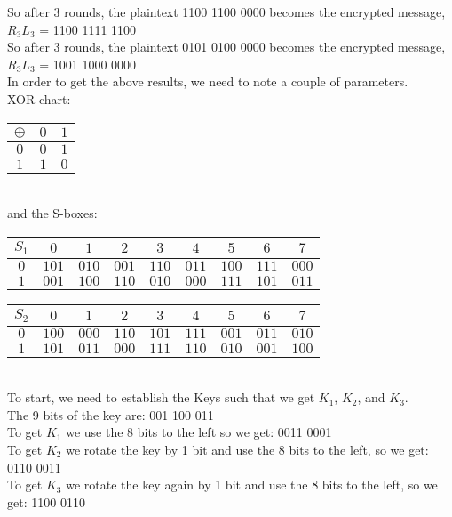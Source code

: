\documentclass[12pt,letterpaper,final]{report}
\begin{document}
\bigskip
So after 3 rounds, the plaintext 1100 1100 0000 becomes the encrypted message, $R_3L_3$ = 1100 1111 1100 \\
So after 3 rounds, the plaintext 0101 0100 0000 becomes the encrypted message, $R_3L_3$ = 1001 1000 0000 \\

\bigskip In order to get the above results, we need to note a couple of parameters.  \\
XOR chart:  
\indent\begin{tabular}{|c|c c|}
\hline
$ \oplus $ & $ 0 $ & $ 1 $ \\
\hline
$ 0 $ &  $ 0 $ & $ 1 $ \\
$ 1 $ & $ 1 $ & $ 0 $ \\
\hline
\end{tabular} \\

and the S-boxes: \\

\begin{tabular}{|c| c c c c c c c c|}
\hline
$ S_1 $ & $ 0 $ & $ 1 $ & $ 2 $ & $ 3 $ & $ 4 $ & $ 5 $ & $ 6 $ & $ 7 $ \\
\hline
$ 0 $ & $ 101 $ & $ 010 $ & $ 001 $ & $ 110 $ & $ 011 $ & $ 100 $ & $ 111 $ & $ 000 $ \\
$ 1 $ & $ 001 $ & $ 100 $ & $ 110 $ & $ 010 $ & $ 000 $ & $ 111 $ & $ 101 $ & $ 011 $ \\
\hline 
\end{tabular} \bigskip

\begin{tabular}{|c| c c c c c c c c|}
\hline
$ S_2 $ & $ 0 $ & $ 1 $ & $ 2 $ & $ 3 $ & $ 4 $ & $ 5 $ & $ 6 $ & $ 7 $ \\
\hline
$ 0 $ & $ 100 $ & $ 000 $ & $ 110 $ & $ 101 $ & $ 111 $ & $ 001 $ & $ 011 $ & $ 010 $ \\
$ 1 $ & $ 101 $ & $ 011 $ & $ 000 $ & $ 111 $ & $ 110 $ & $ 010 $ & $ 001 $ & $ 100 $ \\
\hline
\end{tabular} \\



\bigskip To start, we need to establish the Keys such that we get $K_1$, $K_2$, and $K_3$. \\
\indent The 9 bits of the key are: 001 100 011 \\
\indent To get $K_1$ we use the 8 bits to the left so we get: 0011 0001 \\
\indent To get $K_2$ we rotate the key by 1 bit and use the 8 bits to the left, so we get: 0110 0011 \\
\indent To get $K_3$ we rotate the key again by 1 bit and use the 8 bits to the left, so we get: 1100 0110 \\
\end{document}

